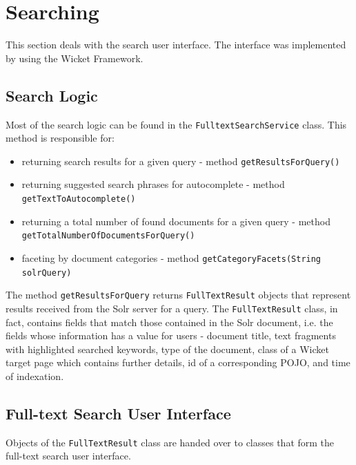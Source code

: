 	
\section{Searching}

This section deals with the search user interface.
The interface was implemented by using the Wicket Framework.


\subsection{Search Logic}

Most of the search logic can be found in the \texttt{FulltextSearchService} class.
This method is responsible for: 

\begin{itemize}

	\item returning search results for a given query - method \texttt{getResults\-ForQuery()}
	\item returning suggested search phrases for autocomplete - method \texttt{getText\-To\-Auto\-complete()}
	\item returning a total number of found documents for a given query - method \texttt{getTotal\-NumberOf\-Documents\-ForQuery()}
	\item faceting by document categories - method \texttt{get\-Category\-Fa\-cets(String solrQuery)}

\end{itemize}

The method \texttt{getResultsForQuery} returns \texttt{FullTextResult} objects that represent results received from the Solr server for a query.
The \texttt{FullTextResult} class, in fact, contains fields that match those contained in the Solr document, i.e. the fields whose information has a value for users - document title, text fragments with highlighted searched keywords, type of the document, class of a Wicket target page which contains further details, id of a corresponding POJO, and time of indexation.

\subsection{Full-text Search User Interface}

Objects of the \texttt{FullTextResult} class are handed over to classes that form the full-text search user interface.  

